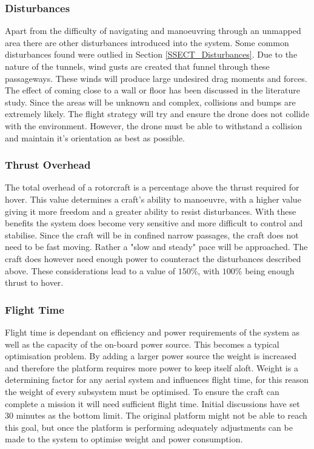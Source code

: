 			\subsubsection{Disturbances}
			Apart from the difficulty of navigating and manoeuvring through an unmapped area there are other disturbances introduced into the system. Some common disturbances found were outlied in Section \ref{SSECT_Disturbances}.
			Due to the nature of the tunnels, wind gusts are created that funnel through these passageways. These winds will produce large undesired drag moments and forces.
			The effect of coming close to a wall or floor has been discussed in the literature study. Since the areas will be unknown and complex, collisions and bumps are extremely likely. The flight strategy will try and ensure the drone does not collide with the environment. However, the drone must be able to withstand a collision and maintain it's orientation as best as possible.
			
			\subsubsection{Thrust Overhead}
			The total overhead of a rotorcraft is a percentage above the thrust required for hover. This value determines a craft's ability to manoeuvre, with a higher value giving it more freedom and a greater ability to resist disturbances. With these benefits the system does become very sensitive and more difficult to control and stabilise. Since the craft will be in confined narrow passages, the craft does not need to be fast moving. Rather a "slow and steady" pace will be approached. The craft does however need enough power to counteract the disturbances described above. These considerations lead to a value of $150\%$, with $100\%$ being enough thrust to hover. 
			
			\subsubsection{Flight Time}
			Flight time is dependant on efficiency and power requirements of the system as well as the capacity of the on-board power source. This becomes a typical optimisation problem. By adding a larger power source the weight is increased and therefore the platform requires more power to keep itself aloft. Weight is a determining factor for any aerial system and influences flight time, for this reason the weight of every subsystem must be optimised. To ensure the craft can complete a mission it will need sufficient flight time. Initial discussions have set 30 minutes as the bottom limit. The original platform might not be able to reach this goal, but once the platform is performing adequately adjustments can be made to the system to optimise weight and power consumption. 
			
